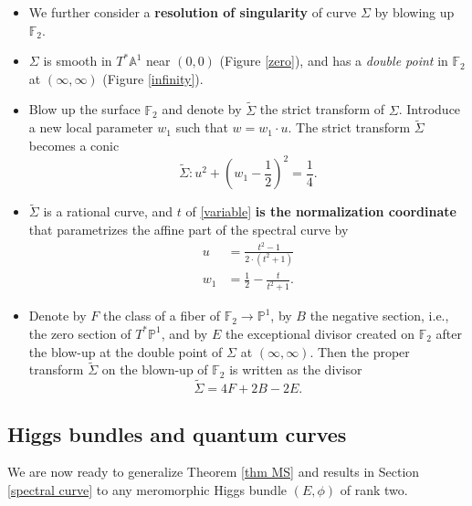 \documentclass[oneside, 11pt]{amsart}
\theoremstyle{definition}
\numberwithin{equation}{subsection}
\newcommand{\bA}{{\mathbb{A}}}
\newcommand{\bP}{{\mathbb{P}}}
\newcommand{\bF}{{\mathbb{F}}}
\newcommand{\rar}{\rightarrow}
\begin{document}
\begin{itemize}
\item We further consider a \textbf{resolution of singularity} of curve $\Sigma$ by blowing up $\bF_2$.
\item $\Sigma$ is smooth  in $T^*\bA^1$ near 
$(0,0)$ (Figure \ref{zero}),
and  has a \textit{double point} in $\mathbb{F}_2$ at $(\infty, \infty)$ (Figure \ref{infinity}). 

\begin{figure}[h]
\centering
{}%
\qquad \qquad
{}%
\caption{}
\end{figure}

\item Blow up the surface $\mathbb{F}_2$ and denote by $\widetilde{\Sigma}$ the strict transform of $\Sigma$. Introduce a new local parameter $w_1$ such that $w=w_1\cdot u$.  The strict transform $\widetilde{\Sigma}$ becomes a conic
$$\widetilde{\Sigma}: u^2+(w_1-\frac{1}{2})^{2}=\frac{1}{4}.$$
\item $\widetilde{\Sigma}$ is a  rational curve, and $t$ of \eqref{variable} \textbf{is the normalization coordinate} that parametrizes  the affine part of the spectral curve by 
\begin{align*}
u&=\frac{t^2-1}{2\cdot(t^2+1)} 
\\ 
w_1&=\frac{1}{2}-\frac{t}{t^2+1}.
\end{align*}
\item Denote by $F$  the class of a fiber
of $\bF_2\rar \bP^1$, by $B$ the negative section, 
i.e., the zero section of 
$T^*\bP^1$, and by $E$  the exceptional divisor created on $\mathbb{F}_2$ after the blow-up at the double point of $\Sigma$ at $(\infty,\infty)$. Then the proper transform $\widetilde{\Sigma}$ on the blown-up of $\mathbb{F}_2$ is written as the divisor 
$$\widetilde{\Sigma} =  4F+2B-2E.$$
\end{itemize}


\subsection{Higgs bundles and quantum curves}
We are now ready to generalize Theorem \ref{thm MS} and results in Section \ref{spectral curve} to any meromorphic Higgs bundle $(E, \phi)$ of rank two. 
\end{document}
